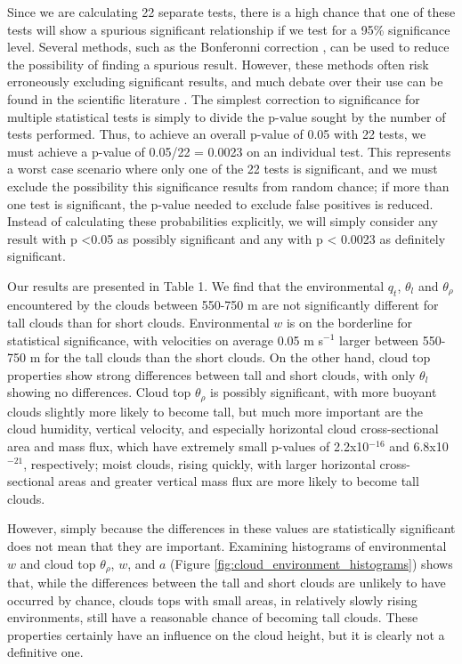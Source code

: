 \documentclass[acp]{copernicus}
\begin{document}
Since we are calculating 22 separate tests, there is a high chance that one of 
these tests will show a spurious significant relationship if we test for a 95\% 
significance level.  Several methods, such as the Bonferonni correction 
\citep{Shaffer1995}, can be used to reduce the possibility of finding a 
spurious result.  However, these methods often risk erroneously excluding 
significant results, and much debate over their use can be found in the 
scientific literature \citep{Perneger1998, Nakagawa2004}.  The simplest 
correction to significance for multiple statistical tests is simply to divide 
the p-value sought by the number of tests performed.  Thus, to achieve an 
overall p-value of 0.05 with 22 tests, we must achieve a p-value of 0.05/22 = 
0.0023 on an individual test. This represents a worst case scenario where only 
one of the 22 tests is significant, and we must exclude the possibility this 
significance results from random chance; if more than one test is significant, 
the p-value needed to exclude false positives is reduced.  Instead of 
calculating these probabilities explicitly, we will simply consider any result 
with p \textless 0.05 as possibly significant and any with p \textless 
0.0023 as definitely significant.  

Our results are presented in Table 1.  We find that the environmental 
$q_t$, $\theta_l$ and $\theta_\rho$ encountered by the clouds between 
550-750 m are not significantly different for tall clouds than for short clouds.  
Environmental $w$ is on the borderline for statistical significance, with 
velocities on average 0.05 m s$^{-1}$ larger between 550-750 m for the tall 
clouds than the short clouds.  On the other hand, cloud top properties show 
strong differences between tall and short clouds, with only $\theta_l$ showing 
no differences.  Cloud top $\theta_\rho$ is possibly significant, with 
more buoyant clouds slightly more likely to become tall, but much more 
important are the cloud humidity, vertical velocity, and especially horizontal 
cloud cross-sectional area and mass flux, which have extremely small p-values 
of 2.2x10$^{-16}$ and 6.8x10$^{-21}$, respectively; moist clouds, rising 
quickly, with larger horizontal cross-sectional areas and greater vertical mass 
flux are more likely to become tall clouds.

However, simply because the differences in these values are statistically 
significant does not mean that they are important.  Examining histograms of 
environmental $w$ and cloud top $\theta_\rho$, $w$, and $a$ (Figure 
\ref{fig:cloud_environment_histograms}) shows that, while the differences 
between the tall and short clouds are unlikely to have occurred by chance, 
clouds tops with small areas, in relatively slowly rising environments, still 
have a reasonable chance of becoming tall clouds.  These properties certainly 
have an influence on the cloud height, but it is clearly not a definitive one.
\end{document}
